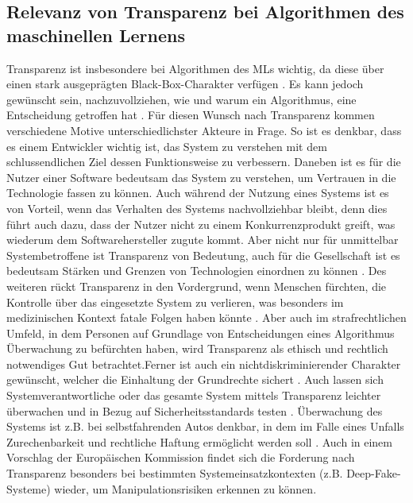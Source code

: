 \subsection{Relevanz von Transparenz bei Algorithmen des maschinellen Lernens}
Transparenz ist insbesondere bei Algorithmen des MLs wichtig, da diese über einen stark ausgeprägten Black-Box-Charakter verfügen \cite{rudin2019stop}. Es kann jedoch gewünscht sein, nachzuvollziehen, wie und warum ein Algorithmus, eine Entscheidung getroffen hat \cite{fink2020quick}. Für diesen Wunsch nach Transparenz kommen verschiedene Motive unterschiedlichster Akteure in Frage. So ist es denkbar, dass es einem Entwickler wichtig ist, das System zu verstehen mit dem schlussendlichen Ziel dessen Funktionsweise zu verbessern. Daneben ist es für die Nutzer einer Software bedeutsam das System zu verstehen, um Vertrauen in die Technologie fassen zu können. Auch während der Nutzung eines Systems ist es von Vorteil, wenn das Verhalten des Systems nachvollziehbar bleibt, denn dies führt auch dazu, dass der Nutzer nicht zu einem Konkurrenzprodukt greift, was wiederum dem Softwarehersteller zugute kommt. Aber nicht nur für unmittelbar Systembetroffene ist Transparenz von Bedeutung, auch für die Gesellschaft ist es bedeutsam Stärken und Grenzen von Technologien einordnen zu können \cite{weller2019transparency}. Des weiteren rückt Transparenz in den Vordergrund, wenn Menschen fürchten, die Kontrolle über das eingesetzte System zu verlieren, was besonders im medizinischen Kontext fatale Folgen haben könnte \cite{fink2020quick, antoniadi2021current}. Aber auch im strafrechtlichen Umfeld, in dem Personen auf Grundlage von Entscheidungen eines Algorithmus Überwachung zu befürchten haben, wird Transparenz als ethisch und rechtlich notwendiges Gut betrachtet.Ferner ist auch ein nichtdiskriminierender Charakter gewünscht, welcher die Einhaltung der Grundrechte sichert \cite{EUVorschlag}. Auch lassen sich Systemverantwortliche oder das gesamte System mittels Transparenz leichter überwachen und in Bezug auf Sicherheitsstandards testen \cite{weller2019transparency, singh2018decision}. Überwachung des Systems ist z.B. bei selbstfahrenden Autos denkbar, in dem im Falle eines Unfalls Zurechenbarkeit und rechtliche Haftung ermöglicht werden soll \cite{weller2019transparency}.  Auch in einem Vorschlag der Europäischen Kommission \cite{EUVorschlag} findet sich die Forderung nach Transparenz besonders bei bestimmten Systemeinsatzkontexten (z.B. Deep-Fake-Systeme) wieder, um Manipulationsrisiken erkennen zu können. 

